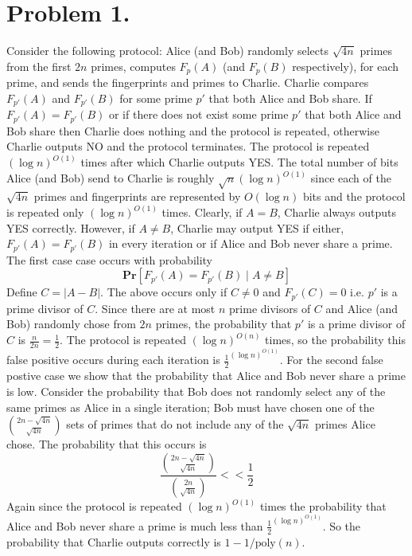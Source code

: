 \documentclass[12pt]{article}
\begin{document}
\section*{Problem 1.}
Consider the following protocol: Alice (and Bob) randomly selects $\sqrt{4n}$
primes from the first $2n$ primes, computes $F_p(A)$ (and $F_p(B)$ respectively),
for each prime, and sends the fingerprints and primes to Charlie.
Charlie compares $F_{p'}(A)$ and $F_{p'}(B)$ for some prime $p'$ that both
Alice and Bob share. If $F_{p'}(A) = F_{p'}(B)$ or if there does not exist some
prime $p'$ that both Alice and Bob share then Charlie does nothing and the
protocol is repeated, otherwise Charlie outputs NO and the protocol terminates.
The protocol is repeated $(\log{n})^{O(1)}$ times after which Charlie outputs YES.
The total number of bits Alice (and Bob) send to Charlie is roughly
$\sqrt{n}(\log{n})^{O(1)}$ since each of the $\sqrt{4n}$ primes and fingerprints
are represented by $O(\log{n})$ bits and the protocol is repeated only
$(\log{n})^{O(1)}$ times. Clearly, if $A = B$, Charlie always outputs YES
correctly. However, if $A \neq B$, Charlie may output YES if either,
$F_{p'}(A) = F_{p'}(B)$ in every iteration or if Alice and Bob never share
a prime. The first case case occurs with probability
$$\textbf{Pr}[F_{p'}(A) = F_{p'}(B) \mid A \neq B]$$
Define $C = |A-B|$. The above occurs only if $C \neq 0$ and $F_{p'}(C) = 0$
i.e. $p'$ is a prime divisor of $C$. Since there are at most $n$ prime divisors
of $C$ and Alice (and Bob) randomly chose from $2n$ primes, the probability
that $p'$ is a prime divisor of $C$ is $\frac{n}{2n} = \frac{1}{2}$.
The protocol is repeated $(\log{n})^{O(n)}$ times, so the probability this false
positive occurs during each iteration is $\frac{1}{2}^{(\log{n})^{O(1)}}$.
For the second false postive case we show that the
probability that Alice and Bob never share a prime is low. Consider the
probability that Bob does not randomly
select any of the same primes as Alice in a single iteration; Bob must have
chosen one of the $2n-\sqrt{4n} \choose \sqrt{4n}$ sets of primes that do not
include any of the $\sqrt{4n}$ primes Alice chose. The probability that this
occurs is
$$\frac{{2n-\sqrt{4n} \choose \sqrt{4n}}}{{2n \choose \sqrt{4n}}} << \frac{1}{2} $$
Again since the protocol is repeated $(\log{n})^{O(1)}$ times the probability
that Alice and Bob never share a prime is much less than
$\frac{1}{2}^{(\log{n})^{O(1)}}$. So the probability that
Charlie outputs correctly is $1-1/\text{poly}(n)$.
\end{document}
